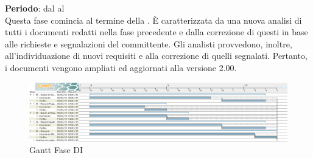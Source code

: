 \textbf{Periodo}: dal  al  \\
Questa fase comincia al termine della . È caratterizzata da una nuova analisi di tutti i documenti redatti nella fase precedente e dalla correzione di questi in base alle richieste e segnalazioni del committente. Gli analisti provvedono, inoltre, all'individuazione di nuovi requisiti e alla correzione di quelli segnalati. Pertanto, i documenti vengono ampliati ed aggiornati alla versione 2.00.
\begin{center}
	\begin{figure}[H]\centering
		\includegraphics[width=\textwidth]{PianoDiProgetto/Pics/FaseDI.png}
		\caption{Gantt Fase DI}
	\end{figure}
\end{center}

